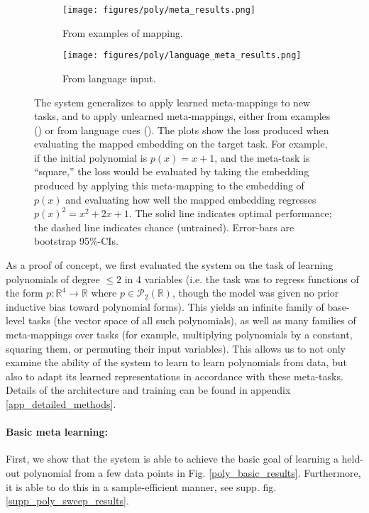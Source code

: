 \documentclass{article}
\begin{document}
\begin{figure}
\centering
\begin{subfigure}{0.5\textwidth}
\texttt{[image: figures/poly/meta\_results.png]}
\caption{From examples of mapping.}
\label{poly_meta_map_results_examples}
\end{subfigure}%
\begin{subfigure}{0.5\textwidth}
\texttt{[image: figures/poly/language\_meta\_results.png]}
\caption{From language input.}
\label{poly_meta_map_results_language}
\end{subfigure}
\caption{The system generalizes to apply learned meta-mappings to new tasks, and to apply unlearned meta-mappings, either from examples () or from language cues (). The plots show the loss produced when evaluating the mapped embedding on the target task. For example, if the initial polynomial is $p(x) = x + 1$, and the meta-task is ``square,'' the loss would be evaluated by taking the embedding produced by applying this meta-mapping to the embedding of $p(x)$ and evaluating how well the mapped embedding regresses $p(x)^2 = x^2 + 2x + 1$. The solid line indicates optimal performance; the dashed line indicates chance (untrained). Error-bars are bootstrap 95\%-CIs.} 
\label{poly_meta_map_results}
\end{figure}
As a proof of concept, we first evaluated the system on the task of learning polynomials of degree $\leq 2$ in 4 variables (i.e. the task was to regress functions of the form $p: \mathbb{R}^4 \rightarrow \mathbb{R}$ where $p \in \mathcal{P}_2 \left(\mathbb{R}\right)$, though the model was given no prior inductive bias toward polynomial forms). This yields an infinite family of base-level tasks (the vector space of all such polynomials), as well as many families of meta-mappings over tasks (for example, multiplying polynomials by a constant, squaring them, or permuting their input variables). This allows us to not only examine the ability of the system to learn to learn polynomials from data, but also to adapt its learned representations in accordance with these meta-tasks. Details of the architecture and training can be found in appendix \ref{app_detailed_methods}.\par
\vspace{-0.7em}
\paragraph{Basic meta learning:} First, we show that the system is able to achieve the basic goal of learning a held-out polynomial from a few data points in Fig. \ref{poly_basic_results}. Furthermore, it is able to do this in a sample-efficient manner, see supp. fig. \ref{supp_poly_sweep_results}. \par 
\vspace{-0.7em}
\end{document}
